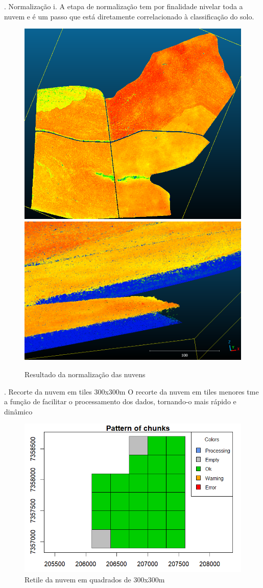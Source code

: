 \documentclass[
]{article}
\begin{document}
. Normalização i. A etapa de normalização tem por finalidade nivelar
toda a nuvem e é um passo que está diretamente correlacionado à
classificação do solo.

\begin{figure}

{\centering \includegraphics[width=0.4\linewidth]{IMAGES/nuvensnormalizadas} \includegraphics[width=0.4\linewidth]{IMAGES/nivelamento} 

}

\caption{Resultado da normalização das nuvens}\label{fig:unnamed-chunk-15}
\end{figure}

. Recorte da nuvem em tiles 300x300m O recorte da nuvem em tiles menores
tme a função de facilitar o processamento dos dados, tornando-o mais
rápido e dinâmico

\begin{figure}

{\centering \includegraphics[width=0.5\linewidth]{IMAGES/Retile} 

}

\caption{Retile da nuvem em quadrados de 300x300m}\label{fig:unnamed-chunk-16}
\end{figure}
\newpage
\end{document}

